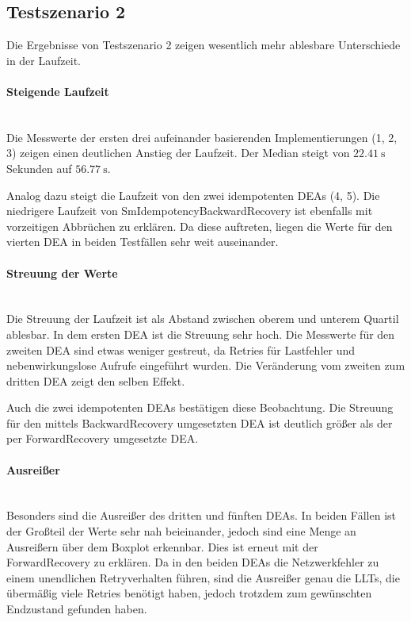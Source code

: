 \subsection{Testszenario 2}
Die Ergebnisse von Testszenario 2 zeigen wesentlich mehr ablesbare Unterschiede in der Laufzeit. 

\paragraph*{Steigende Laufzeit} \mbox{} \\
Die Messwerte der ersten drei aufeinander basierenden Implementierungen (1, 2, 3) zeigen einen deutlichen Anstieg der Laufzeit. Der Median steigt von $\SI{22.41}{\second}$ Sekunden auf $\SI{56.77}{\second}$. 

Analog dazu steigt die Laufzeit von den zwei idempotenten DEAs (4, 5). Die niedrigere Laufzeit von SmIdempotencyBackwardRecovery ist ebenfalls mit vorzeitigen Abbrüchen zu erklären. Da diese auftreten, liegen die Werte für den vierten DEA in beiden Testfällen sehr weit auseinander. 

\paragraph*{Streuung der Werte} \mbox{} \\
Die Streuung der Laufzeit ist als Abstand zwischen oberem und unterem Quartil ablesbar. In dem ersten DEA ist die Streuung sehr hoch. Die Messwerte für den zweiten DEA sind etwas weniger gestreut, da Retries für Lastfehler und nebenwirkungslose Aufrufe eingeführt wurden. Die Veränderung vom zweiten zum dritten DEA zeigt den selben Effekt.

Auch die zwei idempotenten DEAs bestätigen diese Beobachtung. Die Streuung für den mittels BackwardRecovery umgesetzten DEA ist deutlich größer als der per ForwardRecovery umgesetzte DEA. 

\paragraph*{Ausreißer} \mbox{} \\
Besonders sind die Ausreißer des dritten und fünften DEAs. In beiden Fällen ist der Großteil der Werte sehr nah beieinander, jedoch sind eine Menge an Ausreißern über dem Boxplot erkennbar. Dies ist erneut mit der ForwardRecovery zu erklären. Da in den beiden DEAs die Netzwerkfehler zu einem unendlichen Retryverhalten führen, sind die Ausreißer genau die LLTs, die übermäßig viele Retries benötigt haben, jedoch trotzdem zum gewünschten Endzustand gefunden haben.

